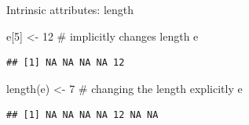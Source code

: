 \documentclass[
  9pt,
  ignorenonframetext,
]{beamer}
\newenvironment{Shaded}{\begin{snugshade}}{\end{snugshade}}
\newcommand{\CommentTok}[1]{\textcolor[rgb]{0.50,0.62,0.50}{#1}}
\newcommand{\DecValTok}[1]{\textcolor[rgb]{0.86,0.86,0.80}{#1}}
\newcommand{\KeywordTok}[1]{\textcolor[rgb]{0.94,0.87,0.69}{#1}}
\newcommand{\NormalTok}[1]{\textcolor[rgb]{0.80,0.80,0.80}{#1}}
\newcommand{\StringTok}[1]{\textcolor[rgb]{0.80,0.58,0.58}{#1}}
\begin{document}
\begin{frame}[fragile]{Intrinsic attributes: length}
\begin{Shaded}
\begin{Highlighting}[]
\NormalTok{e[}\DecValTok{5}\NormalTok{] \textless{}{-}}\StringTok{ }\DecValTok{12}  \CommentTok{\# implicitly changes length}
\NormalTok{e}
\end{Highlighting}
\end{Shaded}

\begin{verbatim}
## [1] NA NA NA NA 12
\end{verbatim}

\begin{Shaded}
\begin{Highlighting}[]
\KeywordTok{length}\NormalTok{(e) \textless{}{-}}\StringTok{ }\DecValTok{7}  \CommentTok{\# changing the length explicitly}
\NormalTok{e}
\end{Highlighting}
\end{Shaded}

\begin{verbatim}
## [1] NA NA NA NA 12 NA NA
\end{verbatim}
\end{frame}
\end{document}
